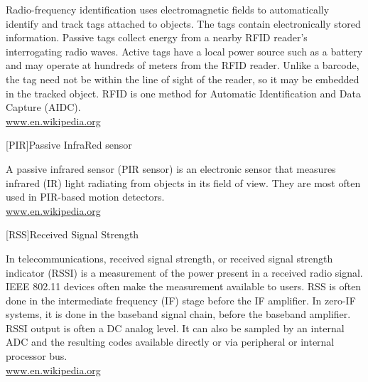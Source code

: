 \begin{acronym}[OpenFOAM]
{\smaller Radio-frequency identification uses electromagnetic fields to automatically identify and track tags attached to objects. The tags contain electronically stored information. Passive tags collect energy from a nearby RFID reader's interrogating radio waves. Active tags have a local power source such as a battery and may operate at hundreds of meters from the RFID reader. Unlike a barcode, the tag need not be within the line of sight of the reader, so it may be embedded in the tracked object. RFID is one method for Automatic Identification and Data Capture (AIDC).\\
\href{https://en.wikipedia.org/wiki/Radio-frequency_identification}{www.en.wikipedia.org}
\par}


[PIR]{Passive InfraRed sensor}

{\smaller A passive infrared sensor (PIR sensor) is an electronic sensor that measures infrared (IR) light radiating from objects in its field of view. They are most often used in PIR-based motion detectors.\\
\href{https://en.wikipedia.org/wiki/Passive_infrared_sensor}{www.en.wikipedia.org}
\par}

[RSS]{Received Signal Strength}

{\smaller In telecommunications, received signal strength, or received signal strength indicator (RSSI) is a measurement of the power present in a received radio signal. IEEE 802.11 devices often make the measurement available to users.
RSS is often done in the intermediate frequency (IF) stage before the IF amplifier. In zero-IF systems, it is done in the baseband signal chain, before the baseband amplifier. RSSI output is often a DC analog level. It can also be sampled by an internal ADC and the resulting codes available directly or via peripheral or internal processor bus.\\
\href{https://en.wikipedia.org/wiki/Received_signal_strength_indication}{www.en.wikipedia.org}
\par}

\end{acronym}
%
